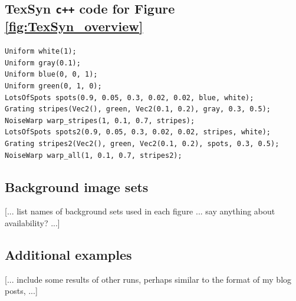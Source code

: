 \documentclass[acmtog]{acmart}
\begin{document}
\subsection{TexSyn \texttt{c++} code for Figure \ref{fig:TexSyn_overview}}
\begin{small}
\begin{verbatim}
Uniform white(1);
Uniform gray(0.1);
Uniform blue(0, 0, 1);
Uniform green(0, 1, 0);
LotsOfSpots spots(0.9, 0.05, 0.3, 0.02, 0.02, blue, white);
Grating stripes(Vec2(), green, Vec2(0.1, 0.2), gray, 0.3, 0.5);
NoiseWarp warp_stripes(1, 0.1, 0.7, stripes);
LotsOfSpots spots2(0.9, 0.05, 0.3, 0.02, 0.02, stripes, white);
Grating stripes2(Vec2(), green, Vec2(0.1, 0.2), spots, 0.3, 0.5);
NoiseWarp warp_all(1, 0.1, 0.7, stripes2);
\end{verbatim}
\end{small}


\subsection{Background image sets}
[... list names of background sets used in each figure ... say anything about availability? ...]

\subsection{Additional examples}
[... include some results of other runs, perhaps similar to the format of my blog posts,  ...]
\end{document}
